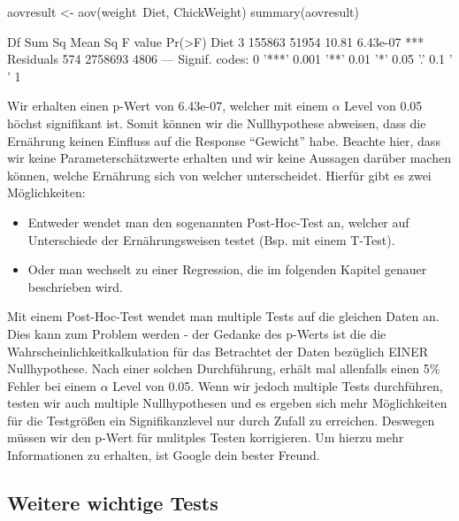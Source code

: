 \documentclass[a4paper,twoside]{tufte-book}\usepackage[]{graphicx}\usepackage[]{color}
\begin{document}
\begin{Schunk}
\begin{Sinput}
aovresult <- aov(weight~Diet, ChickWeight)
summary(aovresult)
\end{Sinput}
\begin{Soutput}
             Df  Sum Sq Mean Sq F value   Pr(>F)    
Diet          3  155863   51954   10.81 6.43e-07 ***
Residuals   574 2758693    4806                     
---
Signif. codes:  0 '***' 0.001 '**' 0.01 '*' 0.05 '.' 0.1 ' ' 1
\end{Soutput}
\end{Schunk}

Wir erhalten einen p-Wert von 6.43e-07, welcher mit einem $\alpha$ Level von 0.05 höchst signifikant ist. Somit können wir die Nullhypothese abweisen, dass die Ernährung keinen Einfluss auf die Response "`Gewicht"' habe. Beachte hier, dass wir keine Parameterschätzwerte erhalten und wir keine Aussagen darüber machen können, welche Ernährung sich von welcher unterscheidet. Hierfür gibt es zwei Möglichkeiten:

\begin{itemize}
\item Entweder wendet man den sogenannten Post-Hoc-Test an, welcher auf Unterschiede der Ernährungsweisen testet (Bsp. mit einem T-Test).
\item Oder man wechselt zu einer Regression, die im folgenden Kapitel genauer beschrieben wird.
\end{itemize}

Mit einem Post-Hoc-Test wendet man multiple Tests auf die gleichen Daten an. Dies kann zum Problem werden - der Gedanke des p-Werts ist die die Wahrscheinlichkeitkalkulation für das Betrachtet der Daten bezüglich EINER Nullhypothese. Nach einer solchen Durchführung, erhält mal allenfalls einen  5\% Fehler bei einem $\alpha$ Level von 0.05.  Wenn wir jedoch multiple Tests durchführen, testen wir auch multiple Nullhypothesen und es ergeben sich mehr Möglichkeiten für die Testgrößen ein Signifikanzlevel nur durch Zufall zu erreichen. Deswegen müssen wir den p-Wert für mulitples Testen korrigieren. Um hierzu mehr Informationen zu erhalten, ist Google dein bester Freund. 

\subsection{Weitere wichtige Tests}
\end{document}
